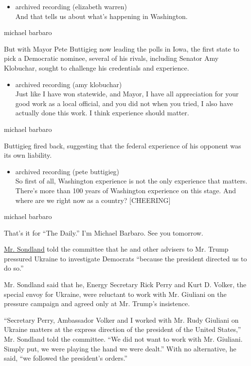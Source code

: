 \begin{itemize}
\tightlist
\item
  archived recording (elizabeth warren)\\
  And that tells us about what's happening in Washington.
\end{itemize}

michael barbaro

But with Mayor Pete Buttigieg now leading the polls in Iowa, the first
state to pick a Democratic nominee, several of his rivals, including
Senator Amy Klobuchar, sought to challenge his credentials and
experience.

\begin{itemize}
\tightlist
\item
  archived recording (amy klobuchar)\\
  Just like I have won statewide, and Mayor, I have all appreciation for
  your good work as a local official, and you did not when you tried, I
  also have actually done this work. I think experience should matter.
\end{itemize}

michael barbaro

Buttigieg fired back, suggesting that the federal experience of his
opponent was its own liability.

\begin{itemize}
\tightlist
\item
  archived recording (pete buttigieg)\\
  So first of all, Washington experience is not the only experience that
  matters. There's more than 100 years of Washington experience on this
  stage. And where are we right now as a country? {[}CHEERING{]}
\end{itemize}

michael barbaro

That's it for ``The Daily.'' I'm Michael Barbaro. See you tomorrow.

\href{https://www.nytimes.com/2019/11/21/podcasts/the-daily/impeachment-sondland.html}{Mr.
Sondland} told the committee that he and other advisers to Mr. Trump
pressured Ukraine to investigate Democrats ``because the president
directed us to do so.''

Mr. Sondland said that he, Energy Secretary Rick Perry and Kurt D.
Volker, the special envoy for Ukraine, were reluctant to work with Mr.
Giuliani on the pressure campaign and agreed only at Mr. Trump's
insistence.

``Secretary Perry, Ambassador Volker and I worked with Mr. Rudy Giuliani
on Ukraine matters at the express direction of the president of the
United States,'' Mr. Sondland told the committee. ``We did not want to
work with Mr. Giuliani. Simply put, we were playing the hand we were
dealt.'' With no alternative, he said, ``we followed the president's
orders.''

